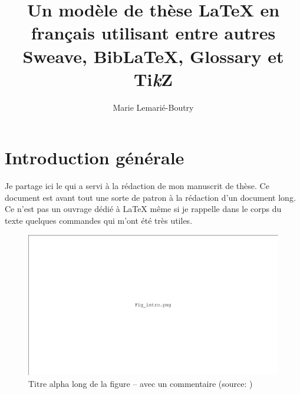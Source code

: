 


\title{Un modèle de thèse \LaTeX{} en français utilisant entre autres Sweave, Bib\LaTeX{}, Glossary et Ti\textit{k}Z}
\author{Marie Lemarié-Boutry}


\usepackage{Sweave}


\frontmatter

\setcounter{page}{1}
\cleardoublepage


\mainmatter
\cleardoublepage
\pagestyle{scrheadings} 

{}
\chapter*{Introduction générale \label{chap:intro}}

Je partage ici le  qui a servi à la rédaction de mon manuscrit de thèse. Ce document est avant tout une sorte de patron à la rédaction d'un document long. Ce n'est pas un ouvrage dédié à \LaTeX{} même si je rappelle dans le corps du texte quelques commandes qui m'ont été très utiles. 

\begin{figure}
\renewcommand{\thefigure}{I.\arabic{figure}}
\includegraphics[width=\textwidth]{pictures/fig_intro.png}
\caption[Titre alpha court de la figure]{Titre alpha long de la figure -- avec un commentaire (source: )}\label{fig:intro}
\end{figure}

